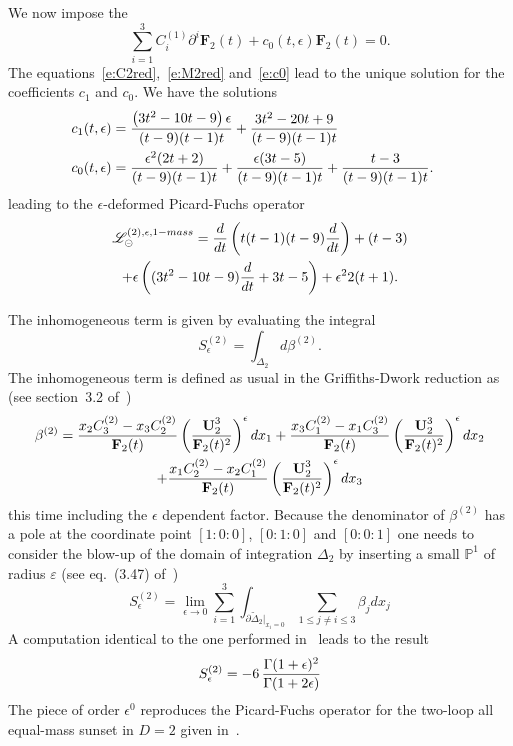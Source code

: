 \documentclass[a4paper,12pt]{article}
\numberwithin{equation}{section}
\numberwithin{figure}{subsection}
\theoremstyle{plain}
\theoremstyle{plain}
\theoremstyle{definition}
\theoremstyle{plain}
\theoremstyle{remark}
\theoremstyle{plain}
\def\su{\circleddash}
\begin{document}
We now impose the 
\begin{equation}\label{e:c0}
  \sum_{i=1}^3C_i^{(1)}\partial^i \textbf{F}_2(t)+ c_0(t,\epsilon) \textbf{F}_2 (t) =0.
\end{equation}
%
The equations~\eqref{e:C2red},~\eqref{e:M2red} and~\eqref{e:c0} lead
to the unique solution for the coefficients $c_1$ and $c_0$.
We have the solutions
\begin{align}
  c_1(t,\epsilon)&=\frac{\left(3 t^2-10 t-9\right) \epsilon }{(t-9) (t-1) t}+\frac{3 t^2-20 t+9}{(t-9) (t-1)
   t}\cr
  c_0(t,\epsilon)&=\frac{\epsilon ^2 (2 t+2)}{(t-9) (t-1) t}+\frac{\epsilon  (3 t-5)}{(t-9) (t-1)
   t}+\frac{t-3}{(t-9) (t-1) t}  .
\end{align}
leading to the $\epsilon$-deformed Picard-Fuchs operator
\begin{multline}
  \label{e:PF2sunset1massepsilon}
     \mathscr{L}^{(2),\epsilon,1-mass}_\su ={d\over dt}\left( t(t-1)(t-9)
       {d\over dt}\right)+(t-3)\cr+\epsilon\left((3t^2-10t-9) {d\over
         dt}+3t-5\right)
     +\epsilon^2 2(t+1).
\end{multline}
%



The inhomogeneous term is given by evaluating the integral 
\begin{equation}
  S_\epsilon^{(2)}=\int_{\Delta_2} d\beta^{(2)} .
\end{equation}
The inhomogeneous term is defined as usual in the Griffiths-Dwork
reduction as (see section~3.2 of~\cite{Bloch:2016izu})
\begin{multline}
  \beta^{(2)}= {x_2 C_3^{(2)} -x_3 C_2^{(2)}\over \textbf{F}_2(t)}
  \left(\textbf{U}_2^3\over \textbf{F}_2(t)^2\right)^\epsilon  dx_1
  + {x_3 C_1^{(2)} -x_1 C_3^{(2)}\over \textbf{F}_2(t)}
  \left(\textbf{U}_2^3\over \textbf{F}_2(t)^2\right)^\epsilon  dx_2\cr+ {x_1 C_2^{(2)} -x_2 C_1^{(2)}\over \textbf{F}_2(t)}
  \left(\textbf{U}_2^3\over \textbf{F}_2(t)^2\right)^\epsilon  dx_3
\end{multline}
this time including the $\epsilon$ dependent factor. 
Because the denominator of $\beta^{(2)}$ has a pole at the coordinate
point $[1:0:0]$, $[0:1:0]$ and $[0:0:1]$ one needs to consider the
blow-up  of the domain of integration $\Delta_2$ by inserting a small
$\mathbb P^1$ of radius $\varepsilon$ (see eq.~(3.47) of~\cite{Bloch:2016izu})
\begin{equation}
    S_\epsilon^{(2)}=\lim_{\epsilon\to0} \sum_{i=1}^3
    \int_{\partial\tilde\Delta_2|_{x_i=0}} \sum_{1\leq j\neq i\leq 3}
    \beta_j dx_j
\end{equation}
A computation identical to the one performed in~\cite{Bloch:2016izu} leads to
the result
\begin{equation}
  S_\epsilon^{(2)}=  -6 \, {\Gamma(1+\epsilon)^2\over \Gamma(1+2\epsilon)}
\end{equation}
The piece of order $\epsilon^0$ reproduces the Picard-Fuchs operator
for the two-loop all equal-mass sunset in $D=2$ given
in~\cite{Bloch:2013tra,Bloch:2013tra,Vanhove:2014wqa,Bonisch:2020qmm,Pogel:2022vat}.
\end{document}
